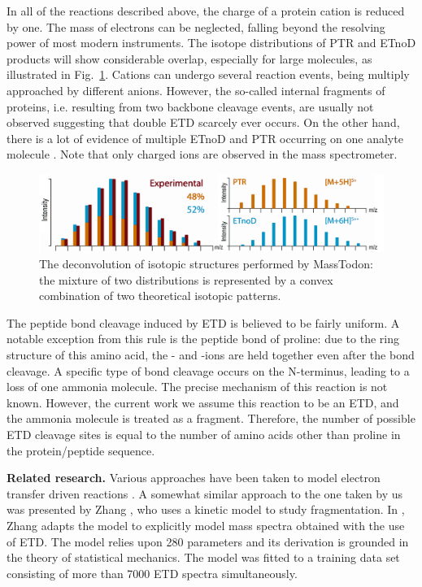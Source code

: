 \documentclass{llncs}
\begin{document}
In all of the reactions described above, the charge of a protein cation is reduced by one. The mass of electrons can be neglected, falling beyond the resolving power of most modern instruments. The isotope distributions of PTR and ETnoD products will show considerable overlap, especially for large molecules, as illustrated in Fig.~\ref{fig::massTodon}. Cations can undergo several reaction events, being multiply approached by different anions. However, the so-called internal fragments of proteins, i.e. resulting from two backbone cleavage events, are usually not observed suggesting that double ETD scarcely ever occurs. On the other hand, there is a lot of evidence of multiple ETnoD and PTR occurring on one analyte molecule  \cite{Lermyte2015-li}. Note that only charged ions are observed in the mass spectrometer.
\begin{figure}[h]\centering
        \includegraphics[width=.8\textwidth]{masstodon.png}
        \caption{The deconvolution of isotopic structures performed by {\sc MassTodon}: the mixture of two distributions is represented by a convex combination of two theoretical isotopic patterns.}\label{fig::massTodon}
\end{figure}


The peptide bond cleavage induced by ETD is believed to be fairly uniform. A notable exception from this rule is the peptide bond of proline: due to the ring structure of this amino acid, the - and -ions are held together even after the  bond cleavage. A specific type of  bond cleavage occurs on the N-terminus, leading to a loss of one ammonia molecule. The precise mechanism of this reaction is not known. However, the current work we assume this reaction to be an ETD, and the ammonia molecule is treated as a  fragment. Therefore, the number of possible ETD cleavage sites is equal to the number of amino acids other than proline in the protein/peptide sequence.

\textbf{Related research.}
Various approaches have been taken to model electron transfer driven reactions \cite{Breuker2004-az,Simons2010-gy,Zhurov2013-ua,Turecek2013-fq}. A somewhat similar approach to the one taken by us was presented by Zhang \cite{Zhang2004-fp,Zhang2005-jn,Zhang2011-lg}, who uses a kinetic model to study fragmentation.
In \cite{Zhang2010-fp}, Zhang adapts the model to explicitly model mass spectra obtained with the use of ETD. The model relies upon 280 parameters and its derivation is grounded in the theory of statistical mechanics. The model was fitted to a training data set consisting of more than 7000 ETD spectra simultaneously.
\end{document}

